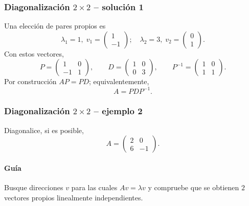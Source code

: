\subsubsection*{Diagonalización $2\times 2$ -- solución 1}
\scriptsize
Una elección de pares propios es
\[
\lambda_1=1,\;v_1=\begin{pmatrix}1\\-1\end{pmatrix};\quad \lambda_2=3,\;v_2=\begin{pmatrix}0\\1\end{pmatrix}.
\]
Con estos vectores,
\[
P=\begin{pmatrix}1 & 0\\-1 & 1\end{pmatrix},\qquad D=\begin{pmatrix}1 & 0\\0 & 3\end{pmatrix},\qquad P^{-1}=\begin{pmatrix}1 & 0\\1 & 1\end{pmatrix}.
\]
Por construcción $AP=PD$; equivalentemente,
\[
\boxed{A=PDP^{-1}}.
\]


\subsubsection*{Diagonalización $2\times 2$ -- ejemplo 2}

Diagonalice, si es posible,
\[
A=\begin{pmatrix}2 & 0\\6 & -1\end{pmatrix}.
\]

\paragraph{Guía}
Busque direcciones $v$ para las cuales $Av=\lambda v$ y compruebe que se obtienen $2$ vectores propios linealmente independientes.



